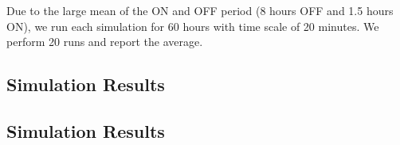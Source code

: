 Due to the large mean of the ON and OFF period (8 hours OFF and 1.5 hours ON), we run each simulation for 60 hours with time scale of 20 minutes. We perform 20 runs and report the average. 
 
\subsection{Simulation Results}
 
%
%
%
%

\subsection{Simulation Results}

